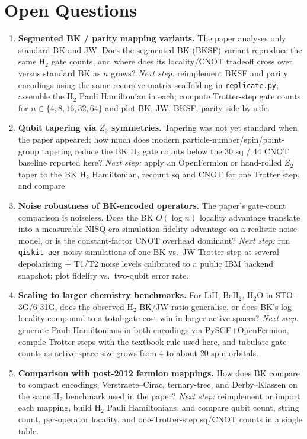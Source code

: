 \section{Open Questions}

\begin{enumerate}
  \item \textbf{Segmented BK / parity mapping variants.} The paper analyses only
        standard BK and JW. Does the segmented BK (BKSF) variant reproduce the
        same H$_2$ gate counts, and where does its locality/CNOT tradeoff cross
        over versus standard BK as $n$ grows?
        \emph{Next step:} reimplement BKSF and parity encodings using the same
        recursive-matrix scaffolding in \texttt{replicate.py}; assemble the H$_2$
        Pauli Hamiltonian in each; compute Trotter-step gate counts for
        $n\in\{4,8,16,32,64\}$ and plot BK, JW, BKSF, parity side by side.

  \item \textbf{Qubit tapering via $Z_2$ symmetries.} Tapering was not yet
        standard when the paper appeared; how much does modern
        particle-number/spin/point-group tapering reduce the BK H$_2$ gate
        counts below the 30 sq / 44 CNOT baseline reported here?
        \emph{Next step:} apply an OpenFermion or hand-rolled $Z_2$ taper to the
        BK H$_2$ Hamiltonian, recount sq and CNOT for one Trotter step,
        and compare.

  \item \textbf{Noise robustness of BK-encoded operators.} The paper's gate-count
        comparison is noiseless. Does the BK $O(\log n)$ locality advantage
        translate into a measurable NISQ-era simulation-fidelity advantage on a
        realistic noise model, or is the constant-factor CNOT overhead
        dominant?
        \emph{Next step:} run \texttt{qiskit-aer} noisy simulations of one BK vs.\
        JW Trotter step at several depolarising + T1/T2 noise levels calibrated
        to a public IBM backend snapshot; plot fidelity vs.\ two-qubit error rate.

  \item \textbf{Scaling to larger chemistry benchmarks.} For LiH, BeH$_2$, H$_2$O
        in STO-3G/6-31G, does the observed H$_2$ BK/JW ratio generalise, or does
        BK's log-locality compound to a total-gate-cost win in larger active
        spaces?
        \emph{Next step:} generate Pauli Hamiltonians in both encodings via
        PySCF+OpenFermion, compile Trotter steps with the textbook rule used
        here, and tabulate gate counts as active-space size grows from 4 to
        about 20 spin-orbitals.

  \item \textbf{Comparison with post-2012 fermion mappings.} How does BK compare
        to compact encodings, Verstraete--Cirac, ternary-tree, and Derby--Klassen
        on the same H$_2$ benchmark used in the paper?
        \emph{Next step:} reimplement or import each mapping, build H$_2$ Pauli
        Hamiltonians, and compare qubit count, string count, per-operator
        locality, and one-Trotter-step sq/CNOT counts in a single table.
\end{enumerate}
